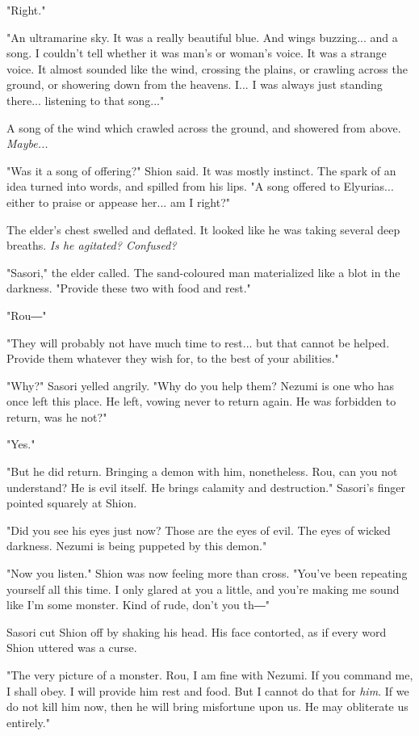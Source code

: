 "Right."

"An ultramarine sky. It was a really beautiful blue. And wings
buzzing... and a song. I couldn't tell whether it was man's or woman's
voice. It was a strange voice. It almost sounded like the wind, crossing
the plains, or crawling across the ground, or showering down from the
heavens. I... I was always just standing there... listening to that
song..."

A song of the wind which crawled across the ground, and showered from
above. \emph{Maybe...}

"Was it a song of offering?" Shion said. It was mostly instinct. The
spark of an idea turned into words, and spilled from his lips. "A song
offered to Elyurias... either to praise or appease her... am I right?"

The elder's chest swelled and deflated. It looked like he was taking
several deep breaths. \emph{Is he agitated? Confused?}

"Sasori," the elder called. The sand-coloured man materialized like a
blot in the darkness. "Provide these two with food and rest."

"Rou―"

"They will probably not have much time to rest... but that cannot be
helped. Provide them whatever they wish for, to the best of your
abilities."

"Why?" Sasori yelled angrily. "Why do you help them? Nezumi is one who
has once left this place. He left, vowing never to return again. He was
forbidden to return, was he not?"

"Yes."

"But he did return. Bringing a demon with him, nonetheless. Rou, can you
not understand? He is evil itself. He brings calamity and destruction."
Sasori's finger pointed squarely at Shion.

"Did you see his eyes just now? Those are the eyes of evil. The eyes of
wicked darkness. Nezumi is being puppeted by this demon."

"Now you listen." Shion was now feeling more than cross. "You've been
repeating yourself all this time. I only glared at you a little, and
you're making me sound like I'm some monster. Kind of rude, don't you
th―"

Sasori cut Shion off by shaking his head. His face contorted, as if
every word Shion uttered was a curse.

"The very picture of a monster. Rou, I am fine with Nezumi. If you
command me, I shall obey. I will provide him rest and food. But I cannot
do that for \emph{him}. If we do not kill him now, then he will bring
misfortune upon us. He may obliterate us entirely."

